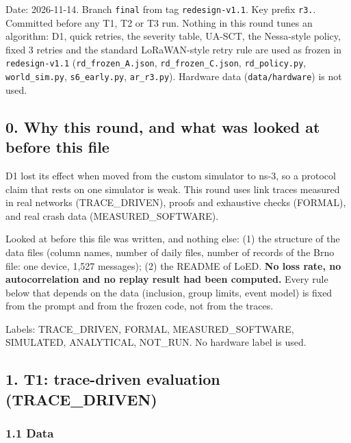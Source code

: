 


Date: 2026-11-14. Branch \texttt{final} from tag \texttt{redesign-v1.1}. Key prefix \texttt{r3.}. Committed before any T1, T2 or T3 run. Nothing in this round tunes an algorithm: D1, quick retries, the severity table, UA-SCT, the Nessa-style policy, fixed 3 retries and the standard LoRaWAN-style retry rule are used as frozen in \texttt{redesign-v1.1} (\texttt{rd\_frozen\_A.json}, \texttt{rd\_frozen\_C.json}, \texttt{rd\_policy.py}, \texttt{world\_sim.py}, \texttt{s6\_early.py}, \texttt{ar\_r3.py}). Hardware data (\texttt{data/hardware}) is not used.

\subsection*{0. Why this round, and what was looked at before this file}

D1 lost its effect when moved from the custom simulator to ns-3, so a protocol claim that rests on one simulator is weak. This round uses link traces measured in real networks (TRACE\_DRIVEN), proofs and exhaustive checks (FORMAL), and real crash data (MEASURED\_SOFTWARE).

Looked at before this file was written, and nothing else: (1) the structure of the data files (column names, number of daily files, number of records of the Brno file: one device, 1,527 messages); (2) the README of LoED. \textbf{No loss rate, no autocorrelation and no replay result had been computed.} Every rule below that depends on the data (inclusion, group limits, event model) is fixed from the prompt and from the frozen code, not from the traces.

Labels: TRACE\_DRIVEN, FORMAL, MEASURED\_SOFTWARE, SIMULATED, ANALYTICAL, NOT\_RUN. No hardware label is used.

\subsection*{1. T1: trace-driven evaluation (TRACE\_DRIVEN)}

\subsubsection*{1.1 Data}


